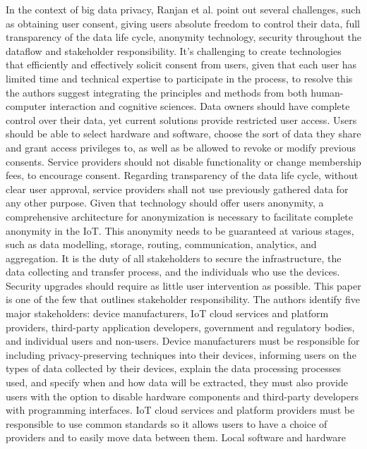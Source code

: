 In the context of big data privacy, Ranjan et al. \cite{perera2015big} point
out several challenges, such as obtaining user consent, giving users absolute
freedom to control their data, full transparency of the data life cycle, anonymity
technology, security throughout the dataflow and stakeholder responsibility.
It's challenging to create technologies that efficiently and effectively solicit
consent from users, given that each user has limited time and technical expertise
to participate in the process, to resolve this the authors suggest
integrating the principles and methods from both human-computer interaction and
cognitive sciences. Data owners should have complete control over their data,
yet current solutions provide restricted user access. Users should be able to
select hardware and software, choose the sort of data they share and grant access
privileges to, as well as be allowed to revoke or modify previous consents.
Service providers should not disable functionality or change membership fees,
to encourage consent. Regarding transparency of the data life cycle, without
clear user approval, service providers shall not use previously gathered data
for any other purpose. Given that technology should offer users anonymity, a
comprehensive architecture for anonymization is necessary to facilitate complete
anonymity in the IoT. This anonymity needs to be guaranteed at various stages,
such as data modelling, storage, routing, communication, analytics, and aggregation.
It is the duty of all stakeholders to secure the infrastructure, the data collecting
and transfer process, and the individuals who use the devices. Security upgrades
should require as little user intervention as possible.
This paper is one of the few that outlines stakeholder responsibility. The
authors identify five major stakeholders: device manufacturers, IoT cloud services
and platform providers, third-party application developers, government and regulatory
bodies, and individual users and non-users. Device manufacturers must be responsible
for including privacy-preserving techniques into their devices, informing users
on the types of data collected by their devices, explain the data processing
processes used, and specify when and how data will be extracted, they must also
provide users with the option to disable hardware components and third-party
developers with programming interfaces. IoT cloud services and platform providers
must be responsible to use common standards so it allows users to have a choice
of providers and to easily move data between them. Local software and hardware
